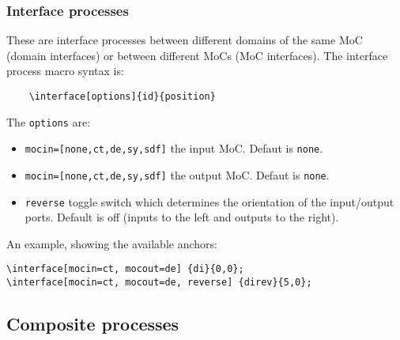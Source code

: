 \documentclass[10pt]{article}
\begin{document}
\subsubsection{Interface processes}

These are interface processes between different domains of the same MoC (domain interfaces) or between different MoCs (MoC interfaces). The interface process macro syntax is:

\begin{verbatim}
	\interface[options]{id}{position}
\end{verbatim}

The \texttt{options} are:
\begin{itemize}
\item \texttt{mocin=[none,ct,de,sy,sdf]} the input MoC. Defaut is \texttt{none}.
\item \texttt{mocin=[none,ct,de,sy,sdf]} the output MoC. Defaut is \texttt{none}.
\item\texttt{reverse} toggle switch which determines the orientation of the input/output ports. Default is off (inputs to the left and outputs to the right).
\end{itemize}

An example, showing the available anchors:
\begin{verbatim}
\interface[mocin=ct, mocout=de] {di}{0,0};
\interface[mocin=ct, mocout=de, reverse] {direv}{5,0};
\end{verbatim}

\begin{figure}[htb!]\centering
{}
\end{figure}

\subsection{Composite processes}
\end{document}
